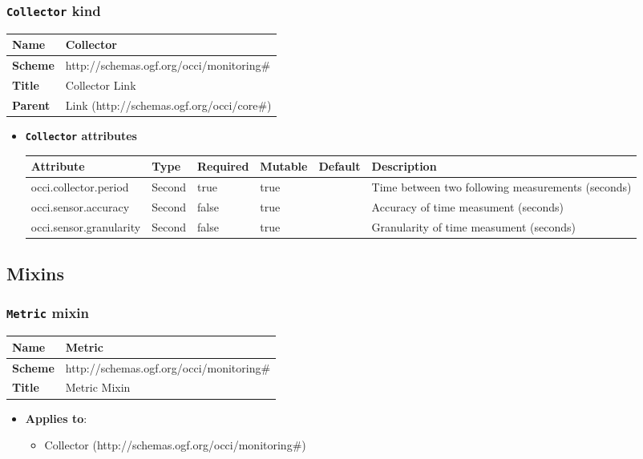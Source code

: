 \subsubsection{\texttt{Collector} kind}
\begin{center}
\begin{tabular}{|l|l|}
  \hline
  \textbf{Name} & Collector \\
  \hline  
  \textbf{Scheme} & http://schemas.ogf.org/occi/monitoring\# \\
  \hline
  \textbf{Title} & Collector Link \\
  \hline
  \textbf{Parent} & Link (http://schemas.ogf.org/occi/core\#) \\
  \hline
\end{tabular}
\end{center}
\begin{itemize}
\item \textbf{\texttt{Collector} attributes}

\begin{tabularx}{\textwidth}{|l|l|p{1.4cm}|p{1.3cm}|l|X|}
  \hline
  \textbf{Attribute} & \textbf{Type} & \textbf{Required} & \textbf{Mutable} & \textbf{Default} & \textbf{Description} \\
  \hline  
  occi.collector.period & Second & true & true &  & Time between two following measurements (seconds) \\
  \hline
  occi.sensor.accuracy & Second & false & true &  & Accuracy of time measument (seconds) \\
  \hline
  occi.sensor.granularity & Second & false & true &  & Granularity of time measument (seconds) \\
  \hline
\end{tabularx}
\end{itemize}



\subsection{Mixins}
\subsubsection{\texttt{Metric} mixin}
\begin{center}
\begin{tabular}{|l|l|}
  \hline
  \textbf{Name} & Metric \\
  \hline  
  \textbf{Scheme} & http://schemas.ogf.org/occi/monitoring\# \\
  \hline
  \textbf{Title} & Metric Mixin \\
  \hline
\end{tabular}
\end{center}
\begin{itemize}
\item \textbf{Applies to}:
\begin{itemize}
	\item Collector (http://schemas.ogf.org/occi/monitoring\#)
\end{itemize}
\end{itemize} 



